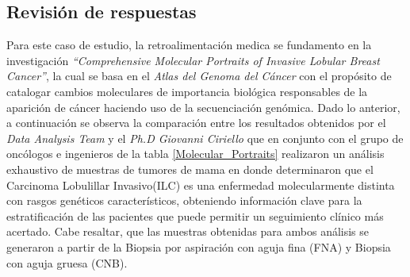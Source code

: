 \subsection{Revisión de respuestas}
Para este caso de estudio, la retroalimentación medica se fundamento en la investigación \textit{“Comprehensive Molecular Portraits of Invasive Lobular Breast Cancer”}\cite{Ciriello2015}, la cual se basa en el \textit {Atlas del Genoma del Cáncer} con el propósito de catalogar cambios moleculares de importancia biológica responsables de la aparición de cáncer haciendo uso de la secuenciación genómica. Dado lo anterior, a continuación se observa la comparación entre los resultados obtenidos por el \textit{Data Analysis Team} y el \textit{Ph.D Giovanni Ciriello} que en conjunto con el grupo de oncólogos e ingenieros de la tabla \ref{Molecular_Portraits} realizaron un análisis exhaustivo de muestras de tumores de mama en donde determinaron que el Carcinoma Lobulillar Invasivo(ILC) es una enfermedad molecularmente distinta con rasgos genéticos característicos, obteniendo información clave para la estratificación de las pacientes que puede permitir un seguimiento clínico más acertado. Cabe resaltar, que las muestras obtenidas para ambos análisis se generaron a partir de la Biopsia por aspiración con aguja fina (FNA) y  Biopsia con aguja gruesa (CNB).
